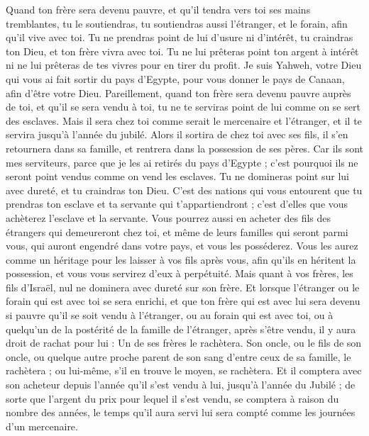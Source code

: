 \begin{multicols}{2}
Quand ton frère sera devenu pauvre, et qu'il tendra vers toi ses mains tremblantes, tu le soutiendras, tu soutiendras aussi l'étranger, et le forain, afin qu'il vive avec toi.
Tu ne prendras point de lui d'usure ni d'intérêt, tu craindras ton Dieu, et ton frère vivra avec toi.
Tu ne lui prêteras point ton argent à intérêt ni ne lui prêteras de tes vivres pour en tirer du profit.
Je suis Yahweh, votre Dieu qui vous ai fait sortir du pays d'Egypte, pour vous donner le pays de Canaan, afin d’être votre Dieu.
Pareillement, quand ton frère sera devenu pauvre auprès de toi, et qu'il se sera vendu à toi, tu ne te serviras point de lui comme on se sert des esclaves.
Mais il sera chez toi comme serait le mercenaire et l'étranger, et il te servira jusqu'à l'année du jubilé.
Alors il sortira de chez toi avec ses fils, il s'en retournera dans sa famille, et rentrera dans la possession de ses pères.
Car ils sont mes serviteurs, parce que je les ai retirés du pays d'Egypte ; c'est pourquoi ils ne seront point vendus comme on vend les esclaves.
Tu ne domineras point sur lui avec dureté, et tu craindras ton Dieu.
C’est des nations qui vous entourent que tu prendras ton esclave et ta servante qui t’appartiendront ; c’est d’elles que vous achèterez l’esclave et la servante.
Vous pourrez aussi en acheter des fils des étrangers qui demeureront chez toi, et même de leurs familles qui seront parmi vous, qui auront engendré dans votre pays, et vous les posséderez.
Vous les aurez comme un héritage pour les laisser à vos fils après vous, afin qu'ils en héritent la possession, et vous vous servirez d'eux à perpétuité. Mais quant à vos frères, les fils d'Israël, nul ne dominera avec dureté sur son frère.
Et lorsque l'étranger ou le forain qui est avec toi se sera enrichi, et que ton frère qui est avec lui sera devenu si pauvre qu'il se soit vendu à l'étranger, ou au forain qui est avec toi, ou à quelqu'un de la postérité de la famille de l'étranger,
après s'être vendu, il y aura droit de rachat pour lui : Un de ses frères le rachètera.
Son oncle, ou le fils de son oncle, ou quelque autre proche parent de son sang d'entre ceux de sa famille, le rachètera ; ou lui-même, s'il en trouve le moyen, se rachètera.
Et il comptera avec son acheteur depuis l'année qu'il s'est vendu à lui, jusqu'à l'année du Jubilé ; de sorte que l'argent du prix pour lequel il s'est vendu, se comptera à raison du nombre des années, le temps qu'il aura servi lui sera compté comme les journées d'un mercenaire.

\end{multicols}
